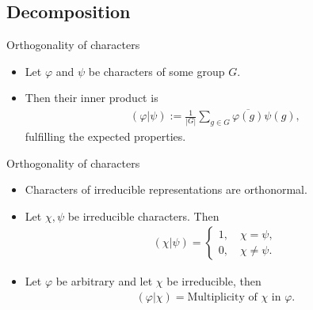 \documentclass[10pt]{beamer}
\begin{document}
	\subsection{Decomposition}
	\begin{frame}{Orthogonality of characters}		
		\begin{definition}\pause
			\begin{itemize}
				\item Let $\varphi$ and $\psi$ be characters of some group $G$.\pause
				\item Then their \alert{inner product} is \begin{align*}
					(\varphi|\psi) := \frac{1}{|G|}\sum_{g \in G}\overline{\varphi(g)}\psi(g),
				\end{align*}
				fulfilling the expected properties.\pause
			\end{itemize}
		\end{definition}
	\end{frame}
	\begin{frame}{Orthogonality of characters}		
		\begin{theorem}
			\begin{itemize}
			
				\item Characters of irreducible representations are orthonormal.\pause
				
				\item Let $\chi, \psi$ be irreducible characters. Then \begin{align*}
					(\chi|\psi) = \begin{cases}
						1, \quad \chi = \psi, \\
						0, \quad \chi \neq \psi.
					\end{cases}
				\end{align*}\pause
				
				\item Let $\varphi$ be arbitrary and let $\chi$ be irreducible, then \begin{align*}
					(\varphi|\chi) = \text{Multiplicity of $\chi$ in $\varphi$}.
				\end{align*}
			\end{itemize}
		\end{theorem}
	\end{frame}
\end{document}
